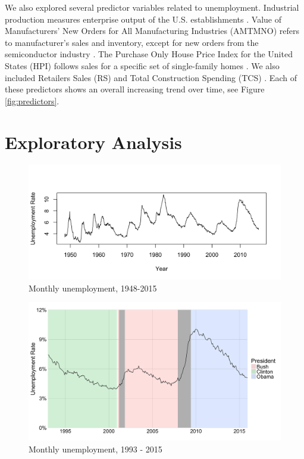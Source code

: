 \documentclass[twoside,twocolumn]{article}
\begin{document}
We also explored several predictor variables related to unemployment.  Industrial production measures enterprise output of the U.S. establishments \citep{BGFS2016}. Value of Manufacturers' New Orders for All Manufacturing Industries (AMTMNO) refers to manufacturer's sales and inventory, except for new orders from the semiconductor industry \citep{vmno}. The Purchase Only House Price Index for the United States (HPI) follows sales for a specific set of single-family homes \citep{fhfa2016}. We also included Retailers Sales (RS) \citep{retail2016} and Total Construction Spending (TCS) \citep{construction2016}. Each of these predictors shows an overall increasing trend over time, see Figure \ref{fig:predictors}.

\section{Exploratory Analysis}
		\begin{figure}[htb]
		\centering
		\caption{Monthly unemployment, 1948-2015}
		\label{fig:unemployment}
		\includegraphics[width=\linewidth]{images/unemployment_total_sa}
	\end{figure}

				\begin{figure}[htb]
		\centering
		\caption{Monthly unemployment, 1993 - 2015}
		\label{fig:presunemp}
		\includegraphics[width=\linewidth]{images/presunemp}
		\end{figure}
\end{document}
